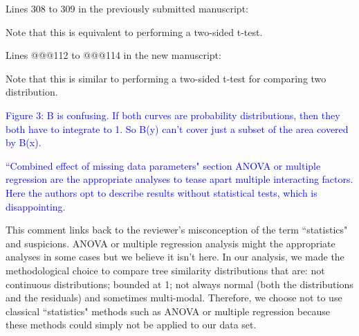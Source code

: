 \documentclass[11pt]{letter}
\begin{document}
\begin{letter}{}
Lines 308 to 309 in the previously submitted manuscript:

\hfill\begin{minipage}{\dimexpr\textwidth-1cm}
Note that this is equivalent to performing a two-sided t-test.
\end{minipage}

Lines @@@112 to @@@114 in the new manuscript:

\hfill\begin{minipage}{\dimexpr\textwidth-1cm}
Note that this is similar to performing a two-sided t-test for comparing two distribution.
\end{minipage}


\textcolor{blue}{Figure 3: B is confusing. If both curves are probability distributions, then they both have to integrate to 1. So B(y) can't cover just a subset of the area covered by B(x).}



\textcolor{blue}{``Combined effect of missing data parameters" section ANOVA or multiple regression are the appropriate analyses to tease apart multiple interacting factors. Here the authors opt to describe results without statistical tests, which is disappointing.}

This comment links back to the reviewer's misconception of the term ``statistics" and suspicions. ANOVA or multiple regression analysis might the appropriate analyses in some cases but we believe it isn't here. In our analysis, we made the methodological choice to compare tree similarity distributions that are: not continuous distributions; bounded at 1; not always normal (both the distributions and the residuals) and sometimes multi-modal. Therefore, we choose not to use classical ``statistics" methods such as ANOVA or multiple regression because these methods could simply not be applied to our data set.


\end{letter}
\end{document}
